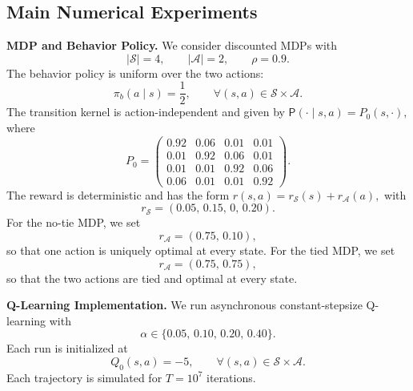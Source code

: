 \documentclass[11pt,letterpaper]{article}
\theoremstyle{plain}
\theoremstyle{definition}
\theoremstyle{remark}
\newcommand{\mS}{\mathcal{S}}
\newcommand{\mA}{\mathcal{A}}
\begin{document}
\subsection{Main Numerical Experiments}\label{app:numerical-details}
\noindent\textbf{MDP and Behavior Policy.}
We consider discounted MDPs with
\[
    |\mS|=4,
    \qquad
    |\mA|=2,
    \qquad
    \rho=0.9.
\]
The behavior policy is uniform over the two actions:
\[
    \pi_b(a\mid s)=\frac12,
    \qquad
    \forall (s,a)\in\mS\times\mA.
\]
The transition kernel is action-independent and given by $\mathsf P(\cdot\mid s,a)=P_0(s,\cdot),$
where
\[
P_0
=
\begin{pmatrix}
0.92 & 0.06 & 0.01 & 0.01\\
0.01 & 0.92 & 0.06 & 0.01\\
0.01 & 0.01 & 0.92 & 0.06\\
0.06 & 0.01 & 0.01 & 0.92
\end{pmatrix}.
\]
The reward is deterministic and has the form $r(s,a)=r_{\mS}(s)+r_{\mA}(a),$ with
\[
    r_{\mS}=(0.05,\,0.15,\,0,\,0.20).
\]
For the no-tie MDP, we set
\[
    r_{\mA}=(0.75,\,0.10),
\]
so that one action is uniquely optimal at every state. For the tied MDP, we
set
\[
    r_{\mA}=(0.75,\,0.75),
\]
so that the two actions are tied and optimal at every state. 

\noindent\textbf{Q-Learning Implementation.}
We run asynchronous constant-stepsize Q-learning with
\[
    \alpha\in\{0.05,\,0.10,\,0.20,\,0.40\}.
\]
Each run is initialized at
\[
    Q_0(s,a)=-5,
    \qquad
    \forall (s,a)\in\mS\times\mA.
\]
Each trajectory
is simulated for $T=10^7$ iterations.
\end{document}
